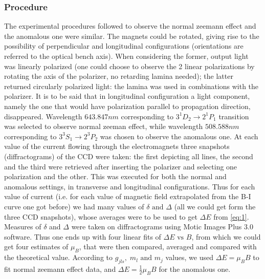 \documentclass[a4paper,12pt,abstracton]{scrartcl}
\begin{document}
\subsubsection{Procedure} \label{subsec:1}
The experimental procedures followed to observe the normal zeemann effect and the anomalous one were similar. The magnets could be rotated, giving rise to the possibility of perpendicular and longitudinal configurations (orientations are referred to the optical bench axis). When considering the former, output light was linearly polarized (one could choose to observe the 2 linear polarizations by rotating the axis of the polarizer, no retarding lamina needed); the latter returned circularly polarized light: the lamina was used in combinations with the polarizer. It is to be said that in longitudinal configuration a light component, namely the one that would have polarization parallel to propagation direction, disappeared.\newline
Wavelength $643.847 nm$ corresponding to $3 ^{1}D_{2} \longrightarrow 2 ^{1}P_{1}$  transition was selected to observe normal zeeman effect, while wavelength $508.588 nm$ corresponding to $3 ^3S_1 \longrightarrow 2 ^3P_2$ was chosen to observe the anomalous one. \newline
At each value of the current flowing through the electromagnets three snapshots (diffractograms) of the CCD were taken: the first depicting all lines, the second and the third were retrieved after inserting the polarizer and selecting one polarization and the other. This was executed for both the normal and anomalous settings, in transverse and longitudinal configurations.\newline
Thus for each value of current (i.e. for each value of magnetic field extrapolated from the B-I curve one got before) we had many values of $\delta \text{ and } \Delta $ (all we could get form the three CCD snapshots), whose averages were to be used to get $\Delta E$ from \ref{eq:1}. Measures of $\delta$ and $\Delta$ were taken on diffractograms using Motic Images Plus 3.0 software.
Thus one ends up with four linear fits of $\Delta E \text{ vs } B$, from which we could get four estimates of $\mu_B$, that were then compared, averaged and compared with the theoretical value. According to $g_{jls} , \; m_l \text{ and } m_j$ values, we used $\Delta E = \mu_B B$ to fit normal zeemann effect data, and $\Delta E =\frac{1}{2} \mu_B B$ for the anomalous one.
%
%
\end{document}
